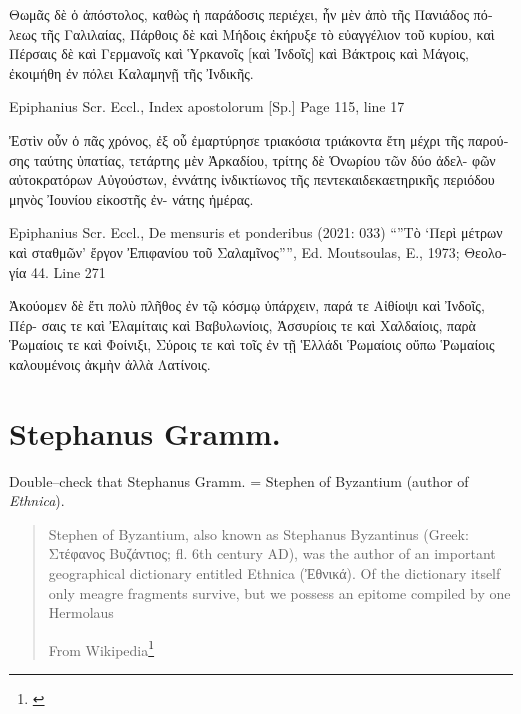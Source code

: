 \documentclass[12pt,letterpaper,twoside,final]{memoir}
\begin{document}
\begin{greek}
     Θωμᾶς δὲ ὁ ἀπόστολος, καθὼς ἡ παράδοσις περιέχει, 
ἦν μὲν ἀπὸ τῆς Πανιάδος πόλεως τῆς Γαλιλαίας, Πάρθοις 
δὲ καὶ Μήδοις ἐκήρυξε τὸ εὐαγγέλιον τοῦ κυρίου, καὶ 
Πέρσαις δὲ καὶ Γερμανοῖς καὶ Ὑρκανοῖς [καὶ Ἰνδοῖς] καὶ 
Βάκτροις καὶ Μάγοις, ἐκοιμήθη ἐν πόλει Καλαμηνῇ τῆς 
Ἰνδικῆς. 



Epiphanius Scr. Eccl., Index apostolorum [Sp.] 
Page 115, line 17

            Ἐστὶν οὖν ὁ πᾶς χρόνος, ἐξ οὗ ἐμαρτύρησε 
τριακόσια τριάκοντα ἔτη μέχρι τῆς παρούσης ταύτης ὑπατίας, 
τετάρτης μὲν Ἀρκαδίου, τρίτης δὲ Ὁνωρίου τῶν δύο ἀδελ-
φῶν αὐτοκρατόρων Αὐγούστων, ἐννάτης ἰνδικτίωνος τῆς 
πεντεκαιδεκαετηρικῆς περιόδου μηνὸς Ἰουνίου εἰκοστῆς ἐν-
νάτης ἡμέρας. 



Epiphanius Scr. Eccl., De mensuris et ponderibus (2021: 033)
“”Τὸ ‘Περὶ μέτρων καὶ σταθμῶν’ ἔργον Ἐπιφανίου τοῦ Σαλαμῖνος””, Ed. Moutsoulas, E., 1973; Θεολογία 44.
Line 271

                                                                  Ἀκούομεν δὲ   
ἔτι πολὺ πλῆθος ἐν τῷ κόσμῳ ὑπάρχειν, παρά τε Αἰθίοψι καὶ Ἰνδοῖς, Πέρ-
σαις τε καὶ Ἐλαμίταις καὶ Βαβυλωνίοις, Ἀσσυρίοις τε καὶ Χαλδαίοις, παρὰ 
Ῥωμαίοις τε καὶ Φοίνιξι, Σύροις τε καὶ τοῖς ἐν τῇ Ἑλλάδι Ῥωμαίοις οὔπω 
Ῥωμαίοις καλουμένοις ἀκμὴν ἀλλὰ Λατίνοις. 

\end{greek}


\section{Stephanus Gramm.}
Double--check that Stephanus Gramm. = Stephen of Byzantium (author of \emph{Ethnica}).

\blockquote[From Wikipedia\footnote{\url{}}]{Stephen of Byzantium, also known as Stephanus Byzantinus (Greek: Στέφανος Βυζάντιος; fl. 6th century AD), was the author of an important geographical dictionary entitled Ethnica (Ἐθνικά). Of the dictionary itself only meagre fragments survive, but we possess an epitome compiled by one Hermolaus}
\end{document}
